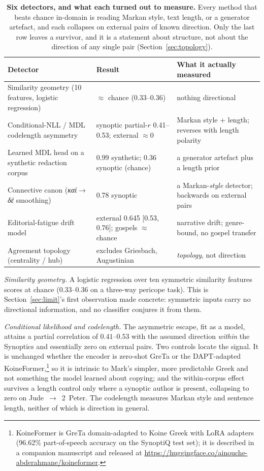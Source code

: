 \documentclass[11pt,letterpaper]{article}
\newcommand{\gk}[1]{{\greekfont\itshape #1}}
\newcommand{\tblhead}{\rowcolor{marine!12}}
\begin{document}
\begin{table}[H]
\centering\small
\setlength{\tabcolsep}{5pt}
\begin{tabular}{L{4.0cm}L{3.2cm}L{5.0cm}}
\toprule
\tblhead\textbf{Detector} & \textbf{Result} & \textbf{What it actually measured} \\
\midrule
Similarity geometry (10 features, logistic regression) & $\approx$ chance (0.33--0.36) & nothing directional \\
\addlinespace[2pt]
Conditional-NLL / MDL codelength asymmetry & synoptic partial-$r$ 0.41--0.53; external $\approx\!0$ & Markan style + length; reverses with length polarity \\
\addlinespace[2pt]
Learned MDL head on a synthetic redaction corpus & 0.99 synthetic; 0.36 synoptic (chance) & a generator artefact plus a length prior \\
\addlinespace[2pt]
Connective canon (\gk{καί}$\to$\gk{δέ} smoothing) & 0.78 synoptic & a Markan-\emph{style} detector; backwards on external pairs \\
\addlinespace[2pt]
Editorial-fatigue drift model & external 0.645 [0.53, 0.76]; gospels $\approx$ chance & narrative drift; genre-bound, no gospel transfer \\
\addlinespace[2pt]
Agreement topology (centrality / hub) & excludes Griesbach, Augustinian & \emph{topology}, not direction \\
\bottomrule
\end{tabular}
\caption{\textbf{Six detectors, and what each turned out to measure.} Every method that beats chance in-domain is reading Markan style, text length, or a generator artefact, and each collapses on external pairs of known direction. Only the last row leaves a survivor, and it is a statement about structure, not about the direction of any single pair (Section~\ref{sec:topology}).}
\label{tab:attempts}
\end{table}

\emph{Similarity geometry.} A logistic regression over ten symmetric similarity features scores at chance (0.33--0.36 on a three-way pericope task). This is Section~\ref{sec:limit}'s first observation made concrete: symmetric inputs carry no directional information, and no classifier conjures it from them.

\emph{Conditional likelihood and codelength.} The asymmetric escape, fit as a model, attains a partial correlation of $0.41$--$0.53$ with the assumed direction \emph{within} the Synoptics and essentially zero on external pairs. Two controls locate the signal. It is unchanged whether the encoder is zero-shot GreTa or the DAPT-adapted KoineFormer,\footnote{KoineFormer is GreTa domain-adapted to Koine Greek with LoRA adapters (96.62\% part-of-speech accuracy on the SynoptiQ test set); it is described in a companion manuscript and released at \url{https://huggingface.co/ainouche-abderahmane/koineformer}.} so it is intrinsic to Mark's simpler, more predictable Greek and not something the model learned about copying; and the within-corpus effect survives a length control only where a synoptic author is present, collapsing to zero on Jude~$\to$~2~Peter. The codelength measures Markan style and sentence length, neither of which is direction in general.
\end{document}
